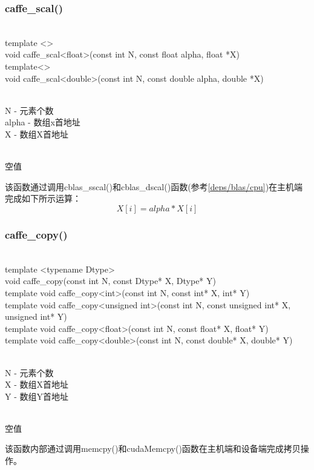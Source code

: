 \subsubsection{caffe\_scal()}
\begin{cnfrmfunc}
   \item{}\\
     template <>\\
     void caffe\_scal<float>(const int N, const float alpha, float *X)\\

     template<>\\
     void caffe\_scal<double>(const int N, const double alpha, double *X)
   \item{}\\
     N - 元素个数\\
     alpha - 数组x首地址\\
     X - 数组X首地址
   \item{}\\
     空值
\end{cnfrmfunc}
该函数通过调用cblas\_sscal()和cblas\_dscal()函数(参考\ref{deps/blas/cpu})在主机端完成如下所示运算：
$$
X[i] = alpha * X[i]
$$
\subsubsection{caffe\_copy()}
\begin{cnfrmfunc}
   \item{}\\
     template <typename Dtype>\\
     void caffe\_copy(const int N, const Dtype* X, Dtype* Y)\\
  
     template void caffe\_copy<int>(const int N, const int* X, int* Y)\\
     template void caffe\_copy<unsigned int>(const int N, const unsigned int* X, unsigned int* Y)\\
     template void caffe\_copy<float>(const int N, const float* X, float* Y)\\
     template void caffe\_copy<double>(const int N, const double* X, double* Y)
   \item{}\\
     N - 元素个数\\
     X - 数组X首地址\\
     Y - 数组Y首地址
   \item{}\\
     空值
\end{cnfrmfunc}
该函数内部通过调用memcpy()和cudaMemcpy()函数在主机端和设备端完成拷贝操作。

